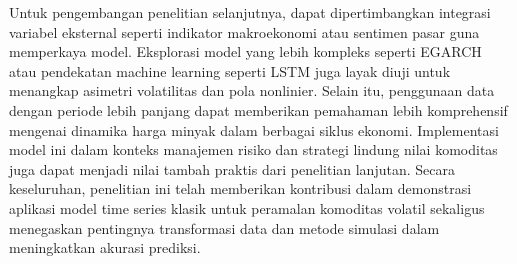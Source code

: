 \documentclass[a4paper,12pt]{article}
\begin{document}
Untuk pengembangan penelitian selanjutnya, dapat dipertimbangkan integrasi variabel eksternal seperti indikator makroekonomi atau sentimen pasar guna memperkaya model. Eksplorasi model yang lebih kompleks seperti EGARCH atau pendekatan machine learning seperti LSTM juga layak diuji untuk menangkap asimetri volatilitas dan pola nonlinier. Selain itu, penggunaan data dengan periode lebih panjang dapat memberikan pemahaman lebih komprehensif mengenai dinamika harga minyak dalam berbagai siklus ekonomi. Implementasi model ini dalam konteks manajemen risiko dan strategi lindung nilai komoditas juga dapat menjadi nilai tambah praktis dari penelitian lanjutan. Secara keseluruhan, penelitian ini telah memberikan kontribusi dalam demonstrasi aplikasi model time series klasik untuk peramalan komoditas volatil sekaligus menegaskan pentingnya transformasi data dan metode simulasi dalam meningkatkan akurasi prediksi.
\newpage
\printbibliography
\end{document}
